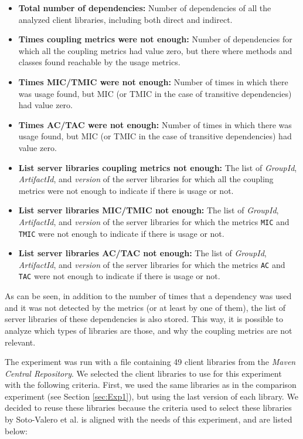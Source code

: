 \begin{itemize}
  \item \textbf{Total number of dependencies:} Number of dependencies of all the analyzed client libraries, including both direct and indirect.
  \item \textbf{Times coupling metrics were not enough:} Number of dependencies for which all the coupling metrics had value zero, but there where methods and classes found reachable by the usage metrics.
  \item \textbf{Times MIC/TMIC were not enough:} Number of times in which there was usage found, but MIC (or TMIC in the case of transitive dependencies) had value zero.
  \item \textbf{Times AC/TAC were not enough:} Number of times in which there was usage found, but MIC (or TMIC in the case of transitive dependencies) had value zero.
  \item \textbf{List server libraries coupling metrics not enough:} The list of \textit{GroupId}, \textit{ArtifactId}, and \textit{version} of the server libraries for which all the coupling metrics were not enough to indicate if there is usage or not.
  \item \textbf{List server libraries MIC/TMIC not enough:} The list of \textit{GroupId}, \textit{ArtifactId}, and \textit{version} of the server libraries for which the metrics \texttt{MIC} and \texttt{TMIC} were not enough to indicate if there is usage or not.
  \item \textbf{List server libraries AC/TAC not enough:} The list of \textit{GroupId}, \textit{ArtifactId}, and \textit{version} of the server libraries for which the metrics \texttt{AC} and \texttt{TAC} were not enough to indicate if there is usage or not.
\end{itemize}

As can be seen, in addition to the number of times that a dependency was used and it was not detected by the metrics (or at least by one of them), the list of server libraries of these dependencies is also stored. This way, it is possible to analyze which types of libraries are those, and why the coupling metrics are not relevant.

\blankl
The experiment was run with a file containing 49 client libraries from the \textit{Maven Central Repository}.  We selected the client libraries to use for this experiment with the following criteria. First, we used the same libraries as in the comparison experiment (see Section \ref{sec:Exp1}), but using the last version of each library. We decided to reuse these libraries because the criteria used to select these libraries by Soto-Valero et al. \cite{soto2020comprehensive} is aligned with the needs of this experiment, and are listed below:


